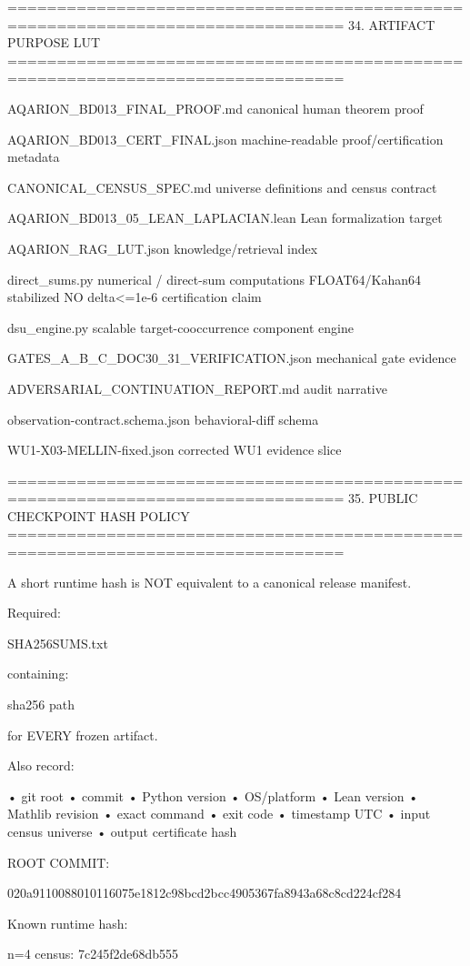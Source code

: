 ================================================================================
34. ARTIFACT PURPOSE LUT
================================================================================

AQARION_BD013_FINAL_PROOF.md
    canonical human theorem proof

AQARION_BD013_CERT_FINAL.json
    machine-readable proof/certification metadata

CANONICAL_CENSUS_SPEC.md
    universe definitions and census contract

AQARION_BD013_05_LEAN_LAPLACIAN.lean
    Lean formalization target

AQARION_RAG_LUT.json
    knowledge/retrieval index

direct_sums.py
    numerical / direct-sum computations
    FLOAT64/Kahan64 stabilized
    NO delta<=1e-6 certification claim

dsu_engine.py
    scalable target-cooccurrence component engine

GATES_A_B_C_DOC30_31_VERIFICATION.json
    mechanical gate evidence

ADVERSARIAL_CONTINUATION_REPORT.md
    audit narrative

observation-contract.schema.json
    behavioral-diff schema

WU1-X03-MELLIN-fixed.json
    corrected WU1 evidence slice

================================================================================
35. PUBLIC CHECKPOINT HASH POLICY
================================================================================

A short runtime hash is NOT equivalent to a canonical release manifest.

Required:

SHA256SUMS.txt

containing:

sha256  path

for EVERY frozen artifact.

Also record:

  • git root
  • commit
  • Python version
  • OS/platform
  • Lean version
  • Mathlib revision
  • exact command
  • exit code
  • timestamp UTC
  • input census universe
  • output certificate hash

ROOT COMMIT:

020a9110088010116075e1812c98bcd2bcc4905367fa8943a68c8cd224cf284

Known runtime hash:

n=4 census:
7c245f2de68db555

